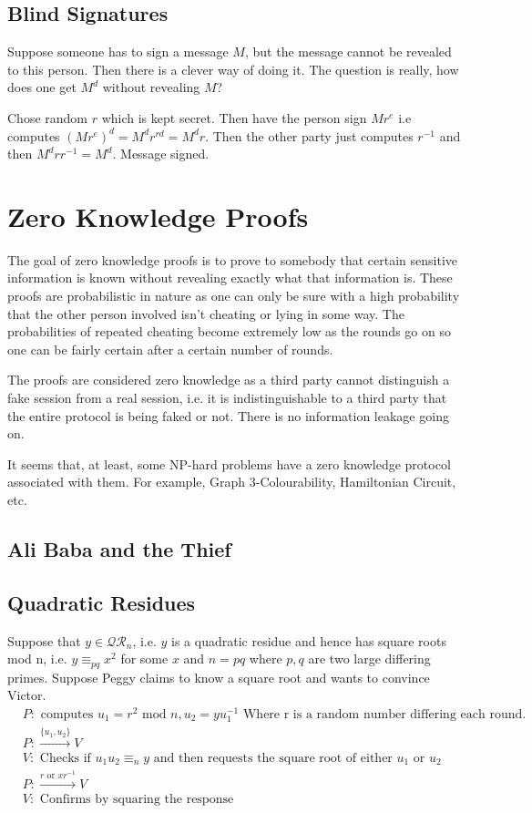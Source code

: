 \documentclass[12pt,a4paper]{article}
\begin{document}
\subsection{Blind Signatures}
Suppose someone has to sign a message $M$, but the message cannot be revealed to this person. Then there is a clever way of doing it. The question is really, how does one get $M^{d}$ without revealing $M$? 

Chose random $r$ which is kept secret. Then have the person sign $Mr^{e}$ i.e computes $(Mr^{e})^{d} = M^{d}r^{rd} = M^{d}r$. Then the other party just computes $r^{-1}$ and then $M^{d}rr^{-1} = M^{d}$. Message signed. 


\section{Zero Knowledge Proofs}
The goal of zero knowledge proofs is to prove to somebody that certain sensitive information is known without revealing exactly what that information is. These proofs are probabilistic in nature as one can only be sure with a high probability that the other person involved isn't cheating or lying in some way. The probabilities of repeated cheating become extremely low as the rounds go on so one can be fairly certain after a certain number of rounds. 

The proofs are considered zero knowledge as a third party cannot distinguish a fake session from a real session, i.e. it is indistinguishable to a third party that the entire protocol is being faked or not. There is no information leakage going on. 

It seems that, at least, some NP-hard problems have a zero knowledge protocol associated with them. For example, Graph 3-Colourability, Hamiltonian Circuit, etc. 

\subsection{Ali Baba and the Thief}
\subsection{Quadratic Residues}
Suppose that $y \in \mathcal{QR}_{n}$, i.e. $y$ is a quadratic residue and hence has square roots mod n, i.e. $y \equiv_{pq} x^{2}$ for some $x$ and $n = pq$ where $p, q$ are two large differing primes. Suppose Peggy claims to know a square root and wants to convince Victor. 
\begin{align*}
	&P: \text{ computes } u_{1} = r^{2} \text{ mod } n, u_{2} = yu_{1}^{-1} \text{ Where r is a random number differing each round.} \\
	&P: \xrightarrow{\{u_1, u_2\}} V \\
	&V: \text{ Checks if } u_{1}u_{2} \equiv_{n} y \text{ and then requests the square root of either } u_{1} \text{ or } u_{2} \\
	&P: \xrightarrow{r \text{ or } xr^{-1}} V \\
	&V: \text{ Confirms by squaring the response} \\ 
\end{align*}
\end{document}
